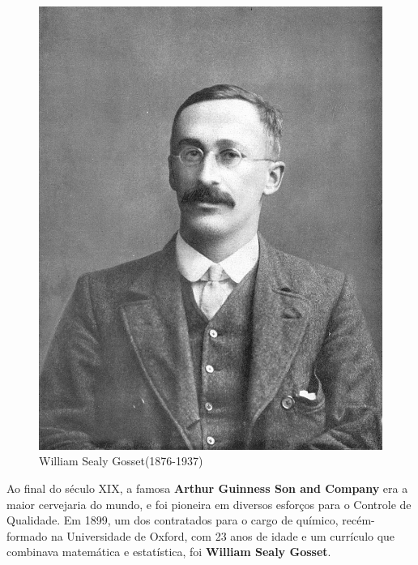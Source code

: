 \begin{figure}
    \centering
\includegraphics[scale=0.15]{figures/William_Sealy_Gosset.jpeg}
    \caption{William Sealy Gosset(1876-1937)}
    \label{fig:my_label3}
\end{figure}


\newpage
Ao final do século XIX, a famosa \textbf{Arthur Guinness Son and Company} era a maior cervejaria do mundo, e foi pioneira em diversos esforços para o Controle de Qualidade. Em 1899, um dos contratados para o cargo de químico, recém-formado na Universidade de Oxford, com 23 anos de idade e um currículo que combinava matemática e estatística, foi \textbf{William Sealy Gosset}.\vskip0.3cm




